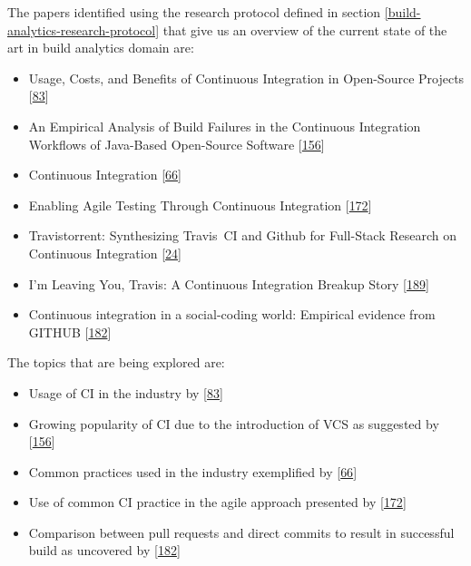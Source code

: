 \documentclass[]{book}
\providecommand{\tightlist}{%
  \setlength{\itemsep}{0pt}\setlength{\parskip}{0pt}}
\begin{document}
The papers identified using the research protocol defined in section
\ref{build-analytics-research-protocol} that give us an overview of the
current state of the art in build analytics domain are:

\begin{itemize}
\tightlist
\item
  Usage, Costs, and Benefits of Continuous Integration in Open-Source
  Projects {[}\protect\hyperlink{ref-hilton2016usage}{83}{]}
\item
  An Empirical Analysis of Build Failures in the Continuous Integration
  Workflows of Java-Based Open-Source Software
  {[}\protect\hyperlink{ref-rausch2017empirical}{156}{]}
\item
  Continuous Integration
  {[}\protect\hyperlink{ref-fowler2006continuous}{66}{]}
\item
  Enabling Agile Testing Through Continuous Integration
  {[}\protect\hyperlink{ref-stolberg2009enabling}{172}{]}
\item
  Travistorrent: Synthesizing Travis~CI and Github for Full-Stack
  Research on Continuous Integration
  {[}\protect\hyperlink{ref-beller2017travistorrent}{24}{]}
\item
  I'm Leaving You, Travis: A Continuous Integration Breakup Story
  {[}\protect\hyperlink{ref-widder2018m}{189}{]}
\item
  Continuous integration in a social-coding world: Empirical evidence
  from GITHUB {[}\protect\hyperlink{ref-vasilescu2014continuous}{182}{]}
\end{itemize}

The topics that are being explored are:

\begin{itemize}
\tightlist
\item
  Usage of CI in the industry by
  {[}\protect\hyperlink{ref-hilton2016usage}{83}{]}
\item
  Growing popularity of CI due to the introduction of VCS as suggested
  by {[}\protect\hyperlink{ref-rausch2017empirical}{156}{]}
\item
  Common practices used in the industry exemplified by
  {[}\protect\hyperlink{ref-fowler2006continuous}{66}{]}
\item
  Use of common CI practice in the agile approach presented by
  {[}\protect\hyperlink{ref-stolberg2009enabling}{172}{]}
\item
  Comparison between pull requests and direct commits to result in
  successful build as uncovered by
  {[}\protect\hyperlink{ref-vasilescu2014continuous}{182}{]}
\end{itemize}
\end{document}
